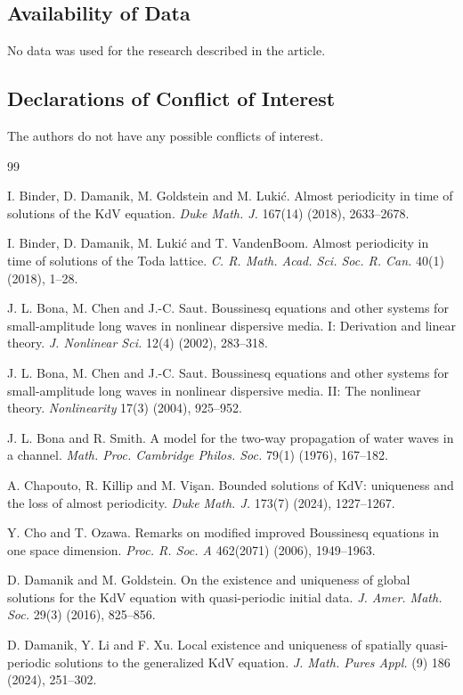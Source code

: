 \documentclass[12pt,reqno,tbtags]{amsart}
\newcommand\1{\mathbbm{1}}
\begin{document}
\subsection*{Availability of Data}  No data was used for the research described in the article.

\subsection*{Declarations of Conflict of Interest}
The authors do not have any possible conflicts of
interest.
\begin{thebibliography}{99}

I. Binder, D. Damanik, M. Goldstein and M. Luki\'{c}. Almost periodicity in time of solutions of the KdV equation. \emph{Duke Math. J.} 167(14) (2018), 2633--2678.

I. Binder, D. Damanik, M. Luki\'{c} and T. VandenBoom. Almost periodicity in time of solutions of the Toda lattice. \emph{C. R. Math. Acad. Sci. Soc. R. Can.} 40(1) (2018), 1--28.

J. L. Bona, M. Chen and J.-C. Saut. Boussinesq equations and other systems for small-amplitude long waves in nonlinear dispersive media. I: Derivation and linear theory. \emph{J. Nonlinear Sci.} 12(4) (2002), 283--318.

J. L. Bona, M. Chen and J.-C. Saut. Boussinesq equations and other systems for small-amplitude long waves in nonlinear dispersive media. II: The nonlinear theory. \emph{Nonlinearity} 17(3) (2004), 925--952.

J. L. Bona and R. Smith. A model for the two-way propagation of water waves in a channel. \emph{Math. Proc. Cambridge Philos. Soc.} 79(1) (1976), 167--182.

A. Chapouto, R. Killip and M. Vi\c{s}an. Bounded solutions of KdV: uniqueness and the loss of almost periodicity. \emph{Duke Math. J.} 173(7) (2024), 1227--1267.

Y. Cho and T. Ozawa. Remarks on modified improved Boussinesq equations in one space dimension. \emph{Proc. R. Soc. A} 462(2071) (2006), 1949--1963.

D. Damanik and M. Goldstein. On the existence and uniqueness of global solutions for the KdV equation with quasi-periodic initial data. \emph{J. Amer. Math. Soc.} 29(3) (2016), 825--856.

D. Damanik, Y. Li and F. Xu. Local existence and uniqueness of spatially quasi-periodic solutions to the generalized KdV equation. \emph{J. Math. Pures Appl.} (9) 186 (2024), 251--302.


\end{thebibliography}
\end{document}
